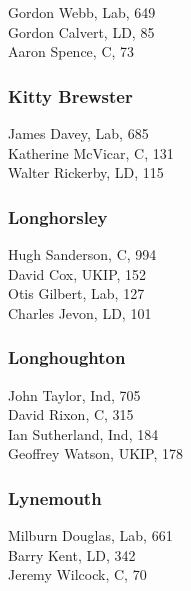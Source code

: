 \documentclass[a4paper,openany,10pt]{book}
\begin{document}


Gordon Webb, Lab, 649\\
Gordon Calvert, LD, 85\\
Aaron Spence, C, 73\\


\subsubsection*{Kitty Brewster}



James Davey, Lab, 685\\
Katherine McVicar, C, 131\\
Walter Rickerby, LD, 115\\


\subsubsection*{Longhorsley}



Hugh Sanderson, C, 994\\
David Cox, UKIP, 152\\
Otis Gilbert, Lab, 127\\
Charles Jevon, LD, 101\\


\subsubsection*{Longhoughton}



John Taylor, Ind, 705\\
David Rixon, C, 315\\
Ian Sutherland, Ind, 184\\
Geoffrey Watson, UKIP, 178\\


\subsubsection*{Lynemouth}



Milburn Douglas, Lab, 661\\
Barry Kent, LD, 342\\
Jeremy Wilcock, C, 70\\
\end{document}

